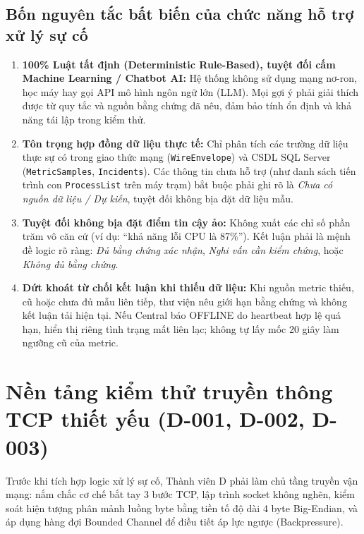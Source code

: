 \documentclass[12pt,a4paper]{article}
\begin{document}
\subsection{Bốn nguyên tắc bất biến của chức năng hỗ trợ xử lý sự cố}
\begin{enumerate}
  \item \textbf{100\% Luật tất định (Deterministic Rule-Based), tuyệt đối cấm Machine Learning / Chatbot AI:} Hệ thống không sử dụng mạng nơ-ron, học máy hay gọi API mô hình ngôn ngữ lớn (LLM). Mọi gợi ý phải giải thích được từ quy tắc và nguồn bằng chứng đã nêu, đảm bảo tính ổn định và khả năng tái lập trong kiểm thử.
  \item \textbf{Tôn trọng hợp đồng dữ liệu thực tế:} Chỉ phân tích các trường dữ liệu thực sự có trong giao thức mạng (\texttt{WireEnvelope}) và CSDL SQL Server (\texttt{MetricSamples}, \texttt{Incidents}). Các thông tin chưa hỗ trợ (như danh sách tiến trình con \texttt{ProcessList} trên máy trạm) bắt buộc phải ghi rõ là \textit{Chưa có nguồn dữ liệu / Dự kiến}, tuyệt đối không bịa đặt dữ liệu mẫu.
  \item \textbf{Tuyệt đối không bịa đặt điểm tin cậy ảo:} Không xuất các chỉ số phần trăm vô căn cứ (ví dụ: ``khả năng lỗi CPU là 87\%''). Kết luận phải là mệnh đề logic rõ ràng: \textit{Đủ bằng chứng xác nhận}, \textit{Nghi vấn cần kiểm chứng}, hoặc \textit{Không đủ bằng chứng}.
  \item \textbf{Dứt khoát từ chối kết luận khi thiếu dữ liệu:} Khi nguồn metric thiếu, cũ hoặc chưa đủ mẫu liên tiếp, thư viện nêu giới hạn bằng chứng và không kết luận tải hiện tại. Nếu Central báo OFFLINE do heartbeat hợp lệ quá hạn, hiển thị riêng tình trạng mất liên lạc; không tự lấy mốc 20 giây làm ngưỡng cũ của metric.
\end{enumerate}



\section{Nền tảng kiểm thử truyền thông TCP thiết yếu (D-001, D-002, D-003)}

\begin{summarybox}
Trước khi tích hợp logic xử lý sự cố, Thành viên D phải làm chủ tầng truyền vận mạng: nắm chắc cơ chế bắt tay 3 bước TCP, lập trình socket không nghẽn, kiểm soát hiện tượng phân mảnh luồng byte bằng tiền tố độ dài 4 byte Big-Endian, và áp dụng hàng đợi Bounded Channel để điều tiết áp lực ngược (Backpressure).
\end{summarybox}
\end{document}
